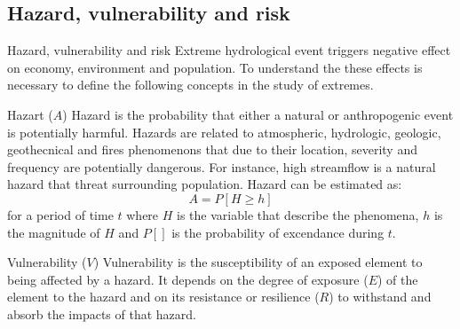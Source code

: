 \documentclass[8pt]{beamer}
\begin{document}
\subsection{Hazard, vulnerability and risk}
\begin{frame}{Hazard, vulnerability and risk}
    Extreme hydrological event triggers  negative effect on economy, environment and population. To understand the these effects is necessary to define the following concepts in the study of extremes. 

    \begin{block}{Hazart ($A$)}
        \alert{Hazard} is the probability that either a natural or anthropogenic event is potentially harmful. Hazards are related to atmospheric, hydrologic, geologic, geothecnical and fires phenomenons that due to their location, severity and frequency are potentially dangerous. For instance, high streamflow is a natural hazard that threat surrounding population. Hazard can be estimated as:
        \[
            A = P[H \geq h]
        \]
        for a period of time $t$ where $H$ is the variable that describe the phenomena, $h$ is the magnitude of $H$ and $P[]$ is the probability of excendance during $t$. 

    \end{block}
    \begin{block}{Vulnerability ($V$)}
        \alert{Vulnerability} is the susceptibility of an exposed element to being affected by a hazard. It depends on the degree of exposure ($E$) of the element to the hazard and on its resistance or resilience ($R$) to withstand and absorb the impacts of that hazard.
    \end{block}

\end{frame}
\end{document}
